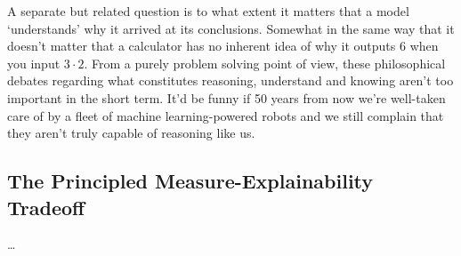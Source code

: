 \documentclass[11pt]{article}
\begin{document}
\begin{appendices}
A separate but related question is to what extent it matters that a model `understands' why it arrived at its conclusions. Somewhat in the same way that it doesn't matter that a calculator has no inherent idea of why it outputs 6 when you input $3\cdot2$. From a purely problem solving point of view, these philosophical debates regarding what constitutes reasoning, understand and knowing aren't too important in the short term. It'd be funny if 50 years from now we're well-taken care of by a fleet of machine learning-powered robots and we still complain that they aren't truly capable of reasoning like us.

\subsection{The Principled Measure-Explainability Tradeoff}
\dots

\end{appendices}
\end{document}
